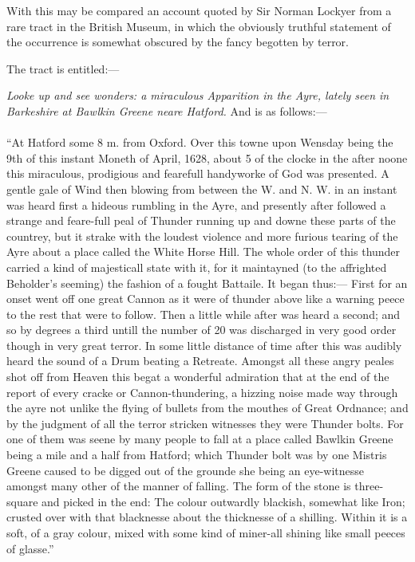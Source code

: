 \documentclass[a4paper, 11pt, oneside]{article}
\begin{document}
With this may be compared an account quoted by Sir Norman Lockyer from a rare tract in the British Museum, in which the obviously truthful statement of the occurrence is somewhat obscured by the fancy begotten by terror. 

The tract is entitled:--- 
\begin{center}
\emph{Looke up and see wonders: a miraculous Apparition in the Ayre, lately seen in Barkeshire at Bawlkin Greene neare Hatford.} And is as follows:--- 
\end{center}
\paragraph{}
``At Hatford some 8 m. from Oxford. Over this towne upon Wensday being the 9th of this instant Moneth of April, 1628, about 5 of the clocke in the after noone this miraculous, prodigious and fearefull handyworke of God was presented. A gentle gale of Wind then blowing from between the W. and N. W. in an instant was heard first a hideous rumbling in the Ayre, and presently after followed a strange and feare-full peal of Thunder running up and downe these parts of the countrey, but it strake with the loudest violence and more furious tearing of the Ayre about a place called the White Horse Hill. The whole order of this thunder carried a kind of majesticall state with it, for it maintayned (to the affrighted Beholder's seeming) the fashion of a fought Battaile. It began thus:--- First for an onset went off one great Cannon as it were of thunder above like a warning peece to the rest that were to follow. Then a little while after was heard a second; and so by degrees a third untill the number of 20 was discharged in very good order though in very great terror. In some little distance of time after this was audibly heard the sound of a Drum beating a Retreate. Amongst all these angry peales shot off from Heaven this begat a wonderful admiration that at the end of the report of every cracke or Cannon-thundering, a hizzing noise made way through the ayre not unlike the flying of bullets from the mouthes of Great Ordnance; and by the judgment of all the terror stricken witnesses they were Thunder bolts. For one of them was seene by many people to fall at a place called Bawlkin Greene being a mile and a half from Hatford; which Thunder bolt was by one Mistris Greene caused to be digged out of the grounde she being an eye-witnesse amongst many other of the manner of falling. The form of the stone is three-square and picked in the end: The colour outwardly blackish, somewhat like Iron; crusted over with that blacknesse about the thicknesse of a shilling. Within it is a soft, of a gray colour, mixed with some kind of miner-all shining like small peeces of glasse.''
\end{document}
